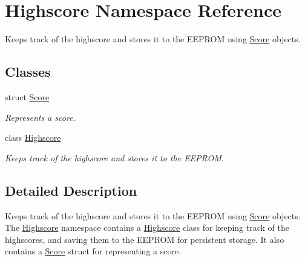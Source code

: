 \hypertarget{namespace_highscore}{\section{Highscore Namespace Reference}
\label{namespace_highscore}
}


Keeps track of the highscore and stores it to the E\-E\-P\-R\-O\-M using \hyperlink{struct_highscore_1_1_score}{Score} objects.  


\subsection*{Classes}
\begin{DoxyCompactItemize}
\item 
struct \hyperlink{struct_highscore_1_1_score}{Score}
\begin{DoxyCompactList}\small\item\em Represents a score. \end{DoxyCompactList}\item 
class \hyperlink{class_highscore_1_1_highscore}{Highscore}
\begin{DoxyCompactList}\small\item\em Keeps track of the highscore and stores it to the E\-E\-P\-R\-O\-M. \end{DoxyCompactList}\end{DoxyCompactItemize}


\subsection{Detailed Description}
Keeps track of the highscore and stores it to the E\-E\-P\-R\-O\-M using \hyperlink{struct_highscore_1_1_score}{Score} objects. The \hyperlink{namespace_highscore}{Highscore} namespace contains a \hyperlink{namespace_highscore}{Highscore} class for keeping track of the highscores, and saving them to the E\-E\-P\-R\-O\-M for persistent storage. It also contains a \hyperlink{struct_highscore_1_1_score}{Score} struct for representing a score. 
